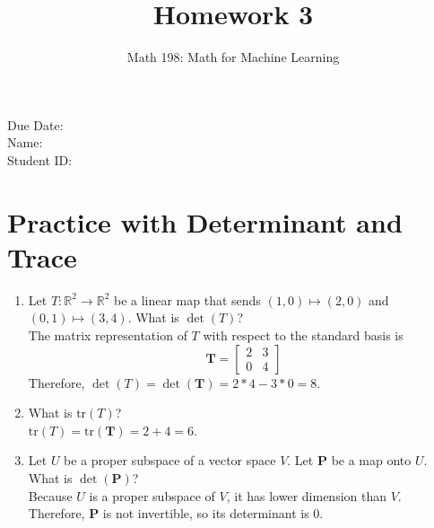 \documentclass{article}
\title{Homework 3}
\author{Math 198: Math for Machine Learning}
\date{}
\begin{document}
\maketitle

\noindent
Due Date:  \\
Name: \\
Student ID:

\section{Practice with Determinant and Trace}
\begin{enumerate}
\item Let $T: \mathbb{R}^2 \to \mathbb{R}^2$ be a linear map that sends $(1,0) \mapsto (2,0)$ and $(0,1) \mapsto (3,4)$. What is $\det(T)$? \\
{\color{blue} The matrix representation of $T$ with respect to the standard basis is $$\mathbf{T} = \begin{bmatrix} 2 & 3 \\ 0 & 4 \end{bmatrix}$$ Therefore, $\det(T) = \det(\mathbf{T}) = 2*4 - 3*0 = 8$.}
\item What is $\text{tr}(T)$? \\
{\color{blue} $\text{tr}(T) = \text{tr}(\mathbf{T}) = 2 + 4 = 6$.}
\item Let $U$ be a proper subspace of a vector space $V$. Let $\mathbf{P}$ be a map onto $U$. What is $\det(\mathbf{P})$? \\
{\color{blue} Because $U$ is a proper subspace of $V$, it has lower dimension than $V$. Therefore, $\mathbf{P}$ is not invertible, so its determinant is 0.}
\end{enumerate}
\end{document}
